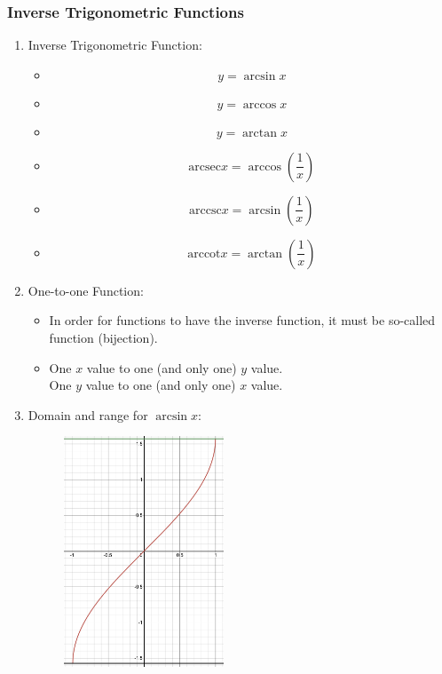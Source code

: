 \documentclass[12pt, a4paper]{article}
\begin{document}
\subsubsection{Inverse Trigonometric Functions}
\begin{enumerate}
  \item Inverse Trigonometric Function: 
  \begin{itemize}
    \item $$y=\arcsin{x}$$
    \item $$y=\arccos{x}$$
    \item $$y=\arctan{x}$$
    \item $$\text{arcsec}x=\arccos{\left(\frac{1}{x}\right)}$$
    \item $$\text{arccsc}x=\arcsin{\left(\frac{1}{x}\right)}$$
    \item $$\text{arccot}x=\arctan{\left(\frac{1}{x}\right)}$$
  \end{itemize}
  \item One-to-one Function: 
  \begin{itemize}
    \item In order for functions to have the inverse function, it must be so-called \textbf{\color{red}{one-to-one}} function (bijection). 
    \item One $x$ value to one (and only one) $y$ value.\\
    One $y$ value to one (and only one) $x$ value. 
  \end{itemize}
  \item Domain and range for $\arcsin{x}$: 
  \begin{itemize}
    \begin{figure}[H]
      \centering
      \includegraphics[width=0.45\textwidth]{Fig.3.31.jpg}

\end{figure}
\end{itemize}
\end{enumerate}
\end{document}
